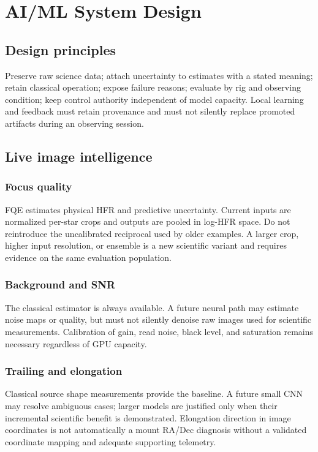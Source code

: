 \documentclass[11pt,a4paper]{article}
\newcommand{\code}[1]{\texttt{\detokenize{#1}}}
\begin{document}
\section{AI/ML System Design}
\subsection{Design principles}
Preserve raw science data; attach uncertainty to estimates with a stated
meaning; retain classical operation; expose failure reasons; evaluate by rig
and observing condition; keep control authority independent of model capacity.
Local learning and feedback must retain provenance and must not silently
replace promoted artifacts during an observing session.

\subsection{Live image intelligence}
\subsubsection{Focus quality}
FQE estimates physical HFR and predictive uncertainty. Current inputs are
normalized per-star crops and outputs are pooled in log-HFR space. Do not
reintroduce the uncalibrated reciprocal \code{sharpness_score} used by older
examples. A larger crop, higher input resolution, or ensemble is a new
scientific variant and requires evidence on the same evaluation population.

\subsubsection{Background and SNR}
The classical estimator is always available. A future neural path may estimate
noise maps or quality, but must not silently denoise raw images used for
scientific measurements. Calibration of gain, read noise, black level, and
saturation remains necessary regardless of GPU capacity.

\subsubsection{Trailing and elongation}
Classical source shape measurements provide the baseline. A future small CNN
may resolve ambiguous cases; larger models are justified only when their
incremental scientific benefit is demonstrated. Elongation direction in image
coordinates is not automatically a mount RA/Dec diagnosis without a validated
coordinate mapping and adequate supporting telemetry.
\end{document}
